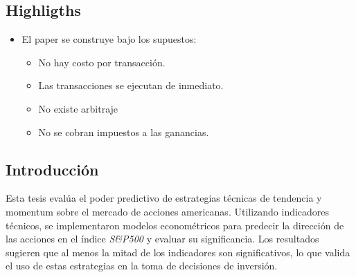 \documentclass[a0,portrait]{a0poster}
\newcommand{\customsection}[1]{
    \begin{center}
        \begin{tcolorbox}[colframe=miRojo!50, colback=miRojo, width=\linewidth, boxrule=1mm, arc=3mm, auto outer arc]
            \centering
            \vspace{.5cm} %
            \color{white}
            \section*{ \textbf{\Huge #1}}  %
            \vspace{.5cm} %
        \end{tcolorbox}
    \end{center}
}
\begin{document}
\begin{multicols}{2}
        \customsection{Highligths}
            
            \begin{itemize}
                \item El paper se construye bajo los supuestos: 
                \begin{itemize}
                    \item No hay costo por transacción.
                    \item Las transacciones se ejecutan de inmediato.
                    \item No existe arbitraje 
                    \item No se cobran impuestos a las ganancias.
                \end{itemize}
            \end{itemize}
    \customsection{Introducción}
    \par
    \normalsize
    Esta tesis evalúa el poder predictivo de estrategias técnicas de tendencia y momentum sobre el mercado de acciones americanas.
     Utilizando indicadores técnicos, se implementaron modelos econométricos para predecir la dirección de las acciones en el 
     índice \textit{S\&P500} y evaluar su significancia. Los resultados sugieren que al menos la mitad de los indicadores son significativos, lo que valida el uso 
     de estas estrategias en la toma de decisiones de inversión.
    

\end{multicols}
\end{document}
